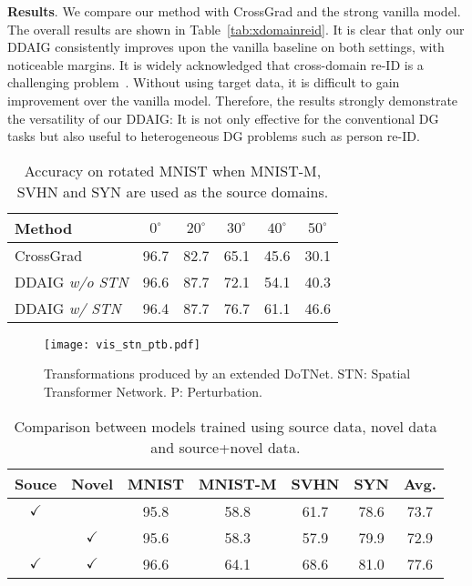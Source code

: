 \documentclass[letterpaper]{article}
\newcommand{\keypoint}[1]{\vspace{0.1cm}\noindent\textbf{#1}}
\newcommand{\tableCellHeight}{1.1}
\begin{document}
\keypoint{Results}.
We compare our method with CrossGrad and the strong vanilla model.
The overall results are shown in Table~\ref{tab:xdomainreid}. It is clear that only our DDAIG consistently improves upon the vanilla baseline on both settings, with noticeable margins.
It is widely acknowledged that cross-domain re-ID is a challenging problem~\cite{zhong2019invariance,zhou2019learning}. Without using target data, it is difficult to gain improvement over the vanilla model. Therefore, the results strongly demonstrate the versatility of our DDAIG: It is not only effective for the conventional DG tasks but also useful to heterogeneous DG problems such as person re-ID.

\begin{table}[t]
    \setlength{\tabcolsep}{7pt}
    \renewcommand{\arraystretch}{\tableCellHeight}
    \centering
    \footnotesize
    \caption{Accuracy on rotated MNIST when MNIST-M, SVHN and SYN are used as the source domains.}
    \label{tab:rotatedMNIST}
    \begin{tabular}{l | c c c c c}
    \hline
    Method & $0^\circ$ & $20^\circ$ & $30^\circ$ & $40^\circ$ & $50^\circ$ \\
    \hline
    CrossGrad & 96.7 & 82.7 & 65.1 & 45.6 & 30.1 \\
    DDAIG \emph{w/o STN} & 96.6 & 87.7 & 72.1 & 54.1 & 40.3 \\
    DDAIG \emph{w/ STN} & 96.4 & 87.7 & 76.7 & 61.1 & 46.6 \\
    \hline
    \end{tabular}
    \vspace{-0.2cm}
\end{table}

\begin{figure}[t]
\centering
\texttt{[image: vis\_stn\_ptb.pdf]}
\caption{\small Transformations produced by an extended DoTNet. STN: Spatial Transformer Network. P: Perturbation.}
\label{fig:vis_stn_ptb}
\vspace{-0.3cm}
\end{figure}

\begin{table}[t]
\setlength{\tabcolsep}{3.5pt}
\renewcommand{\arraystretch}{\tableCellHeight}
\centering
\footnotesize
\caption{Comparison between models trained using source data, novel data and source+novel data.}
\label{tab:vs_newDataonly}
\begin{tabular}{c c | c c c c c}
\hline
Souce & Novel & MNIST & MNIST-M & SVHN & SYN & Avg. \\
\hline
$\checkmark$ & & 95.8 & 58.8 & 61.7 & 78.6 & 73.7 \\ 
 & $\checkmark$ & 95.6 & 58.3 & 57.9 & 79.9 & 72.9 \\
$\checkmark$ & $\checkmark$ & 96.6 & 64.1 & 68.6 & 81.0 & 77.6 \\
\hline
\end{tabular}
\vspace{-0.3cm}
\end{table}
\end{document}
